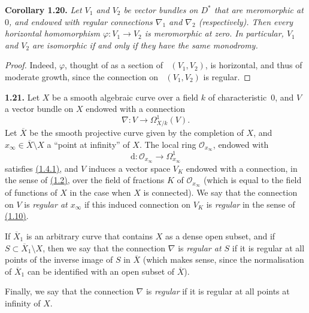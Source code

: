 \documentclass{report}
\newenvironment{itenv}[1]
  {\phantomsection\par\medskip\noindent\textbf{#1.}\itshape}
  {\medskip}
\newenvironment{rmenv}[1]
  {\phantomsection\par\medskip\noindent\textbf{#1.}\rmfamily}
  {\medskip}
\renewcommand{\cal}[1]{{\mathcal{#1}}}
\newcommand{\dd}{\mathrm{d}}
\DeclareMathOperator{\shHom}{\underline{Hom}}
\newcommand{\oldpage}[1]{\marginpar{\footnotesize$\Big\vert$ \textit{p.~#1}}}
\begin{document}
\oldpage{57}
\begin{itenv}{Corollary 1.20}
\label{II.1.20}
  Let $V_1$ and $V_2$ be vector bundles on $D^*$ that are meromorphic at $0$, and endowed with regular connections $\nabla_1$ and $\nabla_2$ (respectively).
  Then every horizontal homomorphism $\varphi\colon V_1\to V_2$ is meromorphic at zero.
  In particular, $V_1$ and $V_2$ are isomorphic if and only if they have the same monodromy.
\end{itenv}

\begin{proof}
  Indeed, $\varphi$, thought of as a section of $\shHom(V_1,V_2)$, is horizontal, and thus of moderate growth, since the connection on $\shHom(V_1,V_2)$ is regular.
\end{proof}

\begin{rmenv}{1.21}
\label{II.1.21}
  Let $X$ be a smooth algebraic curve over a field $k$ of characteristic~$0$, and $V$ a vector bundle on $X$ endowed with a connection
  \[
    \nabla\colon V \to \Omega_{X/k}^1(V).
  \]
  Let $\overline{X}$ be the smooth projective curve given by the completion of $X$, and $x_\infty\in\overline{X}\setminus X$ a ``point at infinity'' of $X$.
  The local ring $\cal{O}_{x_\infty}$, endowed with
  \[
    \dd\colon \cal{O}_{x_\infty} \to \Omega_{x_\infty}^1
  \]
  satisfies \hyperref[II.1.4.1]{(1.4.1)}, and $V$ induces a vector space $V_K$ endowed with a connection, in the sense of \hyperref[II.1.2]{(1.2)}, over the field of fractions $K$ of $\cal{O}_{x_\infty}$ (which is equal to the field of functions of $X$ in the case when $X$ is connected).
  We say that the connection on $V$ is \emph{regular at $x_\infty$} if this induced connection on $V_K$ is \emph{regular} in the sense of \hyperref[II.1.10]{(1.10)}.

  If $\overline{X}_1$ is an arbitrary curve that contains $X$ as a dense open subset, and if $S\subset\overline{X}_1\setminus X$, then we say that the connection $\nabla$ is \emph{regular at $S$} if it is regular at all points of the inverse image of $S$ in $\overline{X}$ (which makes sense, since the normalisation of $\overline{X}_1$ can be identified with an open subset of $\overline{X}$).

  Finally, we say that the connection $\nabla$ is \emph{regular} if it is regular at all points at infinity of $X$.
\end{rmenv}
\end{document}
